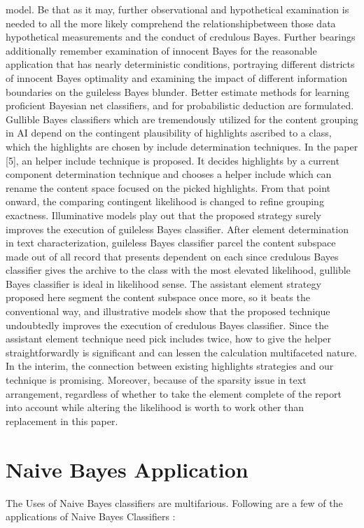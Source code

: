\documentclass[letterpaper,12pt]{article}
\begin{document}
model. Be that as it may, further observational and hypothetical examination is needed to all the more likely comprehend the relationshipbetween those data hypothetical measurements and the conduct of credulous Bayes. Further bearings additionally remember examination of innocent Bayes for the reasonable application that has nearly deterministic conditions, portraying different districts of innocent Bayes optimality and examining the impact of different information boundaries on the guileless Bayes blunder. Better estimate methods for learning proficient Bayesian net classifiers, and for probabilistic deduction are formulated. Gullible Bayes classifiers which are tremendously utilized for the content grouping in AI depend on the contingent plausibility of highlights ascribed to a class, which the highlights are chosen by include determination techniques. In the paper [5], an helper include technique is proposed. It decides highlights by a current component determination technique and chooses a helper include which can rename the content space focused on the picked highlights. From that point onward, the comparing contingent likelihood is changed to refine grouping exactness. Illuminative models play out that the proposed strategy surely improves the execution of guileless Bayes classifier. After element determination in text characterization, guileless Bayes classifier parcel the content subspace made out of all record that presents dependent on each since credulous Bayes classifier gives the archive to the class with the most elevated likelihood, gullible Bayes classifier is ideal in likelihood sense. The assistant element strategy proposed here segment the content subspace once more, 
so it beats the conventional way, and illustrative models show that the proposed technique undoubtedly improves the 
execution of credulous Bayes classifier. 
Since the assistant element technique need pick includes twice, how to give the helper straightforwardly is significant and can lessen the calculation multifaceted nature. In the interim, the connection between existing highlights strategies and our technique is 
promising. Moreover, because of the sparsity issue in text arrangement, regardless of whether to take the element complete of the report into account while altering the likelihood is worth to work other than replacement in this paper.








\section{Naive Bayes Application}
The Uses of Naive Bayes classifiers are multifarious. Following are a few of the applications of Naive Bayes Classifiers :
\end{document}
